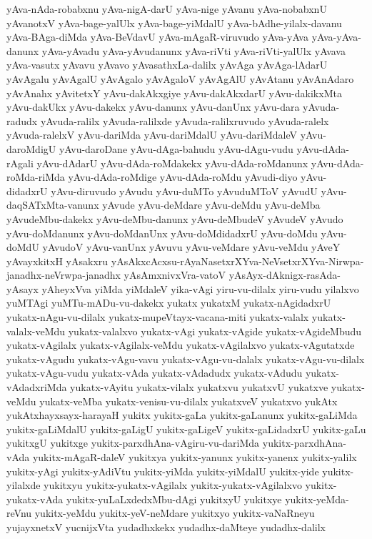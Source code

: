 {yAva-nAda-robabxnu
yAva-nigA-darU
yAva-nige
yAvanu
yAva-nobabxnU
yAvanotxV
yAva-bage-yalUlx
yAva-bage-yiMdalU
yAva-bAdhe-yilalx-davanu
yAva-BAga-diMda
yAva-BeVdavU
yAva-mAgaR-viruvudo
yAva-yAva
yAva-yAva-danunx
yAva-yAvadu
yAva-yAvudanunx
yAva-riVti
yAva-riVti-yalUlx
yAvava
yAva-vasutx
yAvavu
yAvavo
yAvasathxLa-dalilx
yAvAga
yAvAga-lAdarU
yAvAgalu
yAvAgalU
yAvAgalo
yAvAgaloV
yAvAgAlU
yAvAtanu
yAvAnAdaro
yAvAnahx
yAvitetxY
yAvu-dakAkxgiye
yAvu-dakAkxdarU
yAvu-dakikxMta
yAvu-dakUkx
yAvu-dakekx
yAvu-danunx
yAvu-danUnx
yAvu-dara
yAvuda-radudx
yAvuda-ralilx
yAvuda-ralilxde
yAvuda-ralilxruvudo
yAvuda-ralelx
yAvuda-ralelxV
yAvu-dariMda
yAvu-dariMdalU
yAvu-dariMdaleV
yAvu-daroMdigU
yAvu-daroDane
yAvu-dAga-bahudu
yAvu-dAgu-vudu
yAvu-dAda-rAgali
yAvu-dAdarU
yAvu-dAda-roMdakekx
yAvu-dAda-roMdanunx
yAvu-dAda-roMda-riMda
yAvu-dAda-roMdige
yAvu-dAda-roMdu
yAvudi-diyo
yAvu-didadxrU
yAvu-diruvudo
yAvudu
yAvu-duMTo
yAvuduMToV
yAvudU
yAvu-daqSATxMta-vanunx
yAvude
yAvu-deMdare
yAvu-deMdu
yAvu-deMba
yAvudeMbu-dakekx
yAvu-deMbu-danunx
yAvu-deMbudeV
yAvudeV
yAvudo
yAvu-doMdanunx
yAvu-doMdanUnx
yAvu-doMdidadxrU
yAvu-doMdu
yAvu-doMdU
yAvudoV
yAvu-vanUnx
yAvuvu
yAvu-veMdare
yAvu-veMdu
yAveY
yAvayxkitxH
yAsakxru
yAsAkxcAcxsu-rAyaNasetxrXYva-NeVsetxrXYva-Nirwpa-janadhx-neVrwpa-janadhx
yAsAmxnivxVra-vatoV
yAsAyx-dAknigx-rasAda-yAsayx
yAheyxVva
yiMda
yiMdaleV
yika-vAgi
yiru-vu-dilalx
yiru-vudu
yilalxvo
yuMTAgi
yuMTu-mADu-vu-dakekx
yukatx
yukatxM
yukatx-nAgidadxrU
yukatx-nAgu-vu-dilalx
yukatx-mupeVtayx-vacana-miti
yukatx-valalx
yukatx-valalx-veMdu
yukatx-valalxvo
yukatx-vAgi
yukatx-vAgide
yukatx-vAgideMbudu
yukatx-vAgilalx
yukatx-vAgilalx-veMdu
yukatx-vAgilalxvo
yukatx-vAgutatxde
yukatx-vAgudu
yukatx-vAgu-vavu
yukatx-vAgu-vu-dalalx
yukatx-vAgu-vu-dilalx
yukatx-vAgu-vudu
yukatx-vAda
yukatx-vAdadudx
yukatx-vAdudu
yukatx-vAdadxriMda
yukatx-vAyitu
yukatx-vilalx
yukatxvu
yukatxvU
yukatxve
yukatx-veMdu
yukatx-veMba
yukatx-venisu-vu-dilalx
yukatxveV
yukatxvo
yukAtx
yukAtxhayxsayx-harayaH
yukitx
yukitx-gaLa
yukitx-gaLanunx
yukitx-gaLiMda
yukitx-gaLiMdalU
yukitx-gaLigU
yukitx-gaLigeV
yukitx-gaLidadxrU
yukitx-gaLu
yukitxgU
yukitxge
yukitx-parxdhAna-vAgiru-vu-dariMda
yukitx-parxdhAna-vAda
yukitx-mAgaR-daleV
yukitxya
yukitx-yanunx
yukitx-yanenx
yukitx-yalilx
yukitx-yAgi
yukitx-yAdiVtu
yukitx-yiMda
yukitx-yiMdalU
yukitx-yide
yukitx-yilalxde
yukitxyu
yukitx-yukatx-vAgilalx
yukitx-yukatx-vAgilalxvo
yukitx-yukatx-vAda
yukitx-yuLaLxdedxMbu-dAgi
yukitxyU
yukitxye
yukitx-yeMda-reVnu
yukitx-yeMdu
yukitx-yeV-neMdare
yukitxyo
yukitx-vaNaRneyu
yujayxnetxV
yucnijxVta
yudadhxkekx
yudadhx-daMteye
yudadhx-dalilx
}
